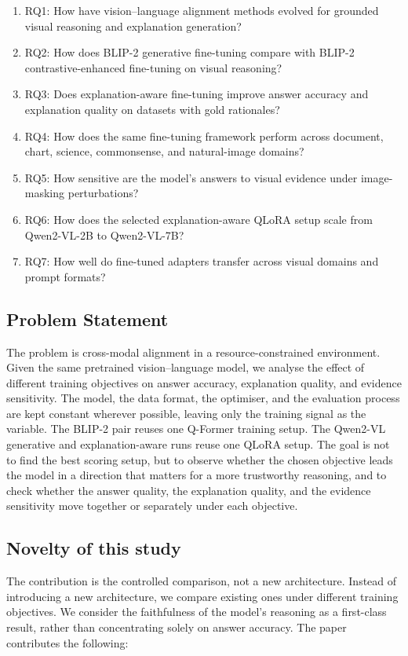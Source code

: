 \documentclass[preprint,12pt]{elsarticle}
\begin{document}
\begin{enumerate}
    \item RQ1: How have vision--language alignment methods evolved for grounded visual reasoning and explanation generation?
    \item RQ2: How does BLIP-2 generative fine-tuning compare with BLIP-2 contrastive-enhanced fine-tuning on visual reasoning?
    \item RQ3: Does explanation-aware fine-tuning improve answer accuracy and explanation quality on datasets with gold rationales?
    \item RQ4: How does the same fine-tuning framework perform across document, chart, science, commonsense, and natural-image domains?
    \item RQ5: How sensitive are the model's answers to visual evidence under image-masking perturbations?
    \item RQ6: How does the selected explanation-aware QLoRA setup scale from Qwen2-VL-2B to Qwen2-VL-7B?
    \item RQ7: How well do fine-tuned adapters transfer across visual domains and prompt formats?
\end{enumerate}

\subsection{Problem Statement}
The problem is cross-modal alignment in a resource-constrained environment.
Given the same pretrained vision--language model, we analyse the effect of different training objectives on answer accuracy, explanation quality, and evidence sensitivity.
The model, the data format, the optimiser, and the evaluation process are kept constant wherever possible, leaving only the training signal as the variable.
The BLIP-2 pair reuses one Q-Former training setup. The Qwen2-VL generative and explanation-aware runs reuse one QLoRA setup.
The goal is not to find the best scoring setup, but to observe whether the chosen objective leads the model in a direction that matters for a more trustworthy reasoning,
and to check whether the answer quality, the explanation quality, and the evidence sensitivity move together or separately under each objective.

\subsection{Novelty of this study}
The contribution is the controlled comparison, not a new architecture.
Instead of introducing a new architecture, we compare existing ones under different training objectives.
We consider the faithfulness of the model's reasoning as a first-class result, rather than concentrating solely on answer accuracy.
The paper contributes the following:
\end{document}
